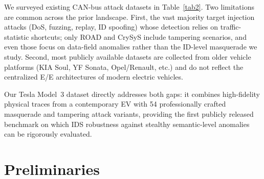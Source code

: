 \documentclass[lettersize,journal]{IEEEtran}
\begin{document}
We surveyed existing CAN-bus attack datasets in
Table~\ref{tab2}. Two limitations are common across the prior
landscape. First, the vast majority target injection attacks
(DoS, fuzzing, replay, ID spoofing) whose detection relies on
traffic-statistic shortcuts; only ROAD and CrySyS include
tampering scenarios, and even those focus on data-field anomalies
rather than the ID-level masquerade we study. Second, most
publicly available datasets are collected from older vehicle
platforms (KIA Soul, YF Sonata, Opel/Renault, etc.) and do not
reflect the centralized E/E architectures of modern electric
vehicles.

Our Tesla Model~3 dataset directly addresses both gaps: it
combines high-fidelity physical traces from a contemporary EV
with 54 professionally crafted masquerade and tampering attack
variants, providing the first publicly released benchmark on
which IDS robustness against stealthy semantic-level anomalies
can be rigorously evaluated.

\section{Preliminaries}
\end{document}
